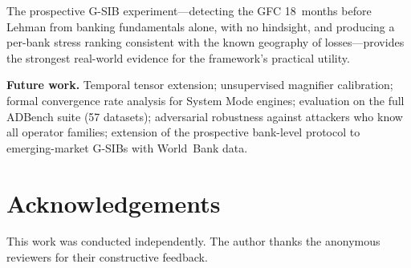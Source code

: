 \documentclass{article}
\begin{document}
The prospective G-SIB experiment---detecting the GFC 18~months before Lehman from banking fundamentals alone, with no hindsight, and producing a per-bank stress ranking consistent with the known geography of losses---provides the strongest real-world evidence for the framework's practical utility.

\textbf{Future work.} Temporal tensor extension; unsupervised magnifier calibration; formal convergence rate analysis for System Mode engines; evaluation on the full ADBench suite (57 datasets); adversarial robustness against attackers who know all operator families; extension of the prospective bank-level protocol to emerging-market G-SIBs with World~Bank data.

\section*{Acknowledgements}
This work was conducted independently. The author thanks the anonymous reviewers for their constructive feedback.


\end{document}
